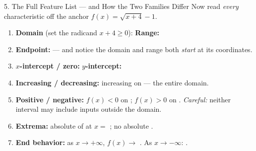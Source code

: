 \documentclass[10pt]{article}
\newcommand{\lgrid}[4]{%
  \draw[step=1, linegray!40, very thin] (#1,#3) grid (#2,#4);
  \draw[->, semithick, charcoal] (#1,0)--(#2,0) node[below right, font=\scriptsize]{$x$};
  \draw[->, semithick, charcoal] (0,#3)--(0,#4) node[left, font=\scriptsize]{$y$};}
\begin{document}
\begin{notesbox}{5. The Full Feature List --- and How the Two Families Differ}
Now read \emph{every} characteristic off the anchor $f(x)=\sqrt{x+4}-1$.
\begin{center}
\end{center}
\begin{enumerate}[leftmargin=1.7em, itemsep=3pt]
  \item \textbf{Domain} (set the radicand $x+4\ge 0$): \ans{$[-4,\infty)$} \quad \textbf{Range:}
        \ans{$[-1,\infty)$}
  \item \textbf{Endpoint:}  --- and notice the domain and range both \emph{start} at
        its coordinates.
  \item \textbf{$x$-intercept / zero:}  \quad \textbf{$y$-intercept:} 
  \item \textbf{Increasing / decreasing:} increasing on \ans{$[-4,\infty)$} --- the entire domain.
  \item \textbf{Positive / negative:} $f(x)<0$ on \ans{$[-4,-3)$}; \quad $f(x)>0$ on
        .
        \emph{Careful:} neither interval may include inputs outside the domain.
  \item \textbf{Extrema:} absolute  of  at $x=$ ; no
        absolute .
  \item \textbf{End behavior:} as $x\to+\infty$, $f(x)\to$ \ans{$+\infty$}. \; As $x\to-\infty$:
        .
\end{enumerate}


\end{notesbox}
\end{document}
